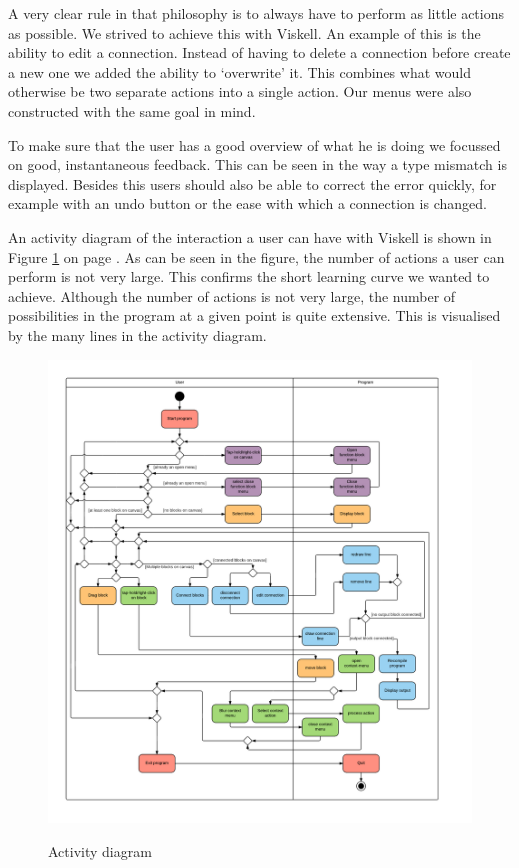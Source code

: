 A very clear rule in that philosophy is to always have to perform as little actions as possible. We strived to achieve this with Viskell. An example of this is the ability to edit a connection. Instead of having to delete a connection before create a new one we added the ability to `overwrite' it. This combines what would otherwise be two separate actions into a single action. Our menus were also constructed with the same goal in mind.

To make sure that the user has a good overview of what he is doing we focussed on good, instantaneous feedback. This can be seen in the way a type mismatch is displayed. Besides this users should also be able to correct the error quickly, for example with an undo button or the ease with which a connection is changed.

An activity diagram of the interaction a user can have with Viskell is shown in Figure \ref{fig:activitydiagram} on page \pageref{fig:activitydiagram}. As can be seen in the figure, the number of actions a user can perform is not very large. This confirms the short learning curve we wanted to achieve. Although the number of actions is not very large, the number of possibilities in the program at a given point is quite extensive. This is visualised by the many lines in the activity diagram.

\begin{figure}[p]
	\centering
	\includegraphics[width=\textwidth]{Images/activitydiagram}
	\label{fig:activitydiagram}
	\caption{Activity diagram}
\end{figure}

